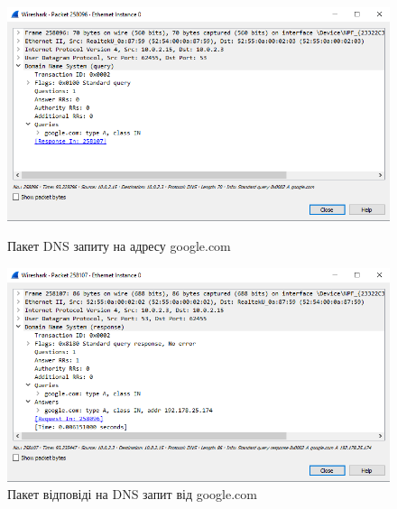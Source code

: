 \documentclass{article}
\begin{document}
\begin{normalsize}
 \begin{figure}[H]
 	\centering
 	\begin{minipage}[t]{0.49\textwidth}
 		\includegraphics[width=\textwidth]{11}
	 	\caption{Пакет DNS запиту на адресу google.com}
 	\end{minipage}
 	\hfill
	 \begin{minipage}[t]{0.49\textwidth}
	 	\includegraphics[width=\textwidth]{12}
		\caption{Пакет відповіді на DNS запит від google.com}
	 \end{minipage}
 \end{figure}
 

\end{normalsize}
\end{document}
